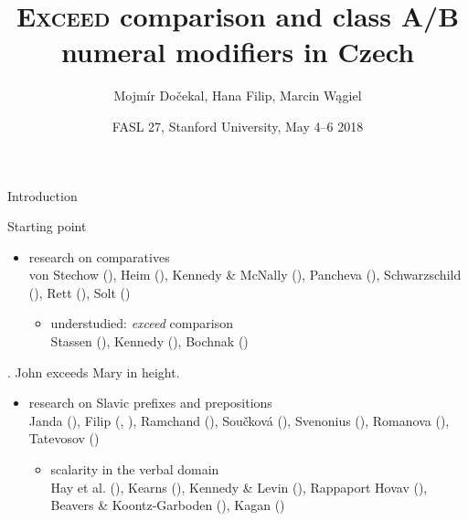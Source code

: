 \documentclass[12pt]{beamer}
\title{\textsc{Exceed} comparison and class A/B numeral modifiers in Czech}
\author{Mojmír Dočekal, Hana Filip, Marcin Wągiel}
\date{FASL 27, Stanford University, May 4--6 2018}
\begin{document}
	\frame{\titlepage}
	

\begin{frame}{Introduction}

Starting point

\begin{itemize}
\item research on comparatives\\
\scriptsize von Stechow (\citeyear{von_stechow1984comparing}), Heim (\citeyear{heim2000degree}), Kennedy \& McNally (\citeyear{kennedy_mcnally2005scale}), Pancheva (\citeyear{pancheva2006phrasal}), Schwarzschild (\citeyear{schwarzschild2008semantics}), Rett (\citeyear{rett2008degree}), Solt (\citeyear{solt2009semantics})\normalsize
\vspace{0.666em}
\begin{itemize}
\item understudied: \textit{exceed} comparison\\
\scriptsize Stassen (\citeyear{stassen1985comparison}), Kennedy (\citeyear{kennedy2005variation}), Bochnak (\citeyear{bochnak2013crosslinguistic})\normalsize
\end{itemize}
\end{itemize}

\ex. John exceeds Mary in height.

\begin{itemize}
\item research on Slavic prefixes and prepositions\\
\scriptsize Janda (\citeyear{janda1985meaning}), Filip (\citeyear{filip2000quantization}, \citeyear{filip2008events}), Ramchand (\citeyear{ramchand2004time}), Součková (\citeyear{souckova2004there}), Svenonius (\citeyear{svenonius2004slavic}), Romanova (\citeyear{romanova2006constructing}), Tatevosov (\citeyear{tatevosov2004slavic})\normalsize
\vspace{0.666em}
\begin{itemize}
\item scalarity in the verbal domain\\
\scriptsize Hay et al. (\citeyear{hay_kennedy_levin1999scalar}), Kearns (\citeyear{kearns2007telic}), Kennedy \& Levin (\citeyear{kennedy_levin2008measure}), Rappaport Hovav (\citeyear{rappaport-hovav2008lexicalized}), Beavers \& Koontz-Garboden (\citeyear{beavers_koontz-garboden2012manner}), Kagan (\citeyear{kagan2013scalarity})\normalsize
\end{itemize}
\end{itemize}

\end{frame}
\end{document}
